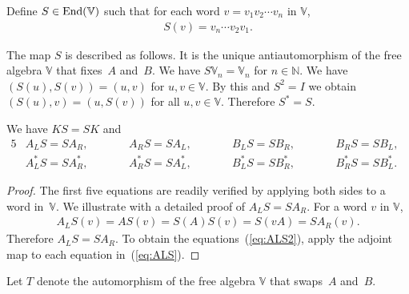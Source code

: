 \begin{Definition}\label{def:S}Define $S \in {\rm End}(\mathbb V)$ such that for each word $v = v_1 v_2 \cdots v_n$ in $\mathbb V$,
\begin{gather*}
S(v) = v_n \cdots v_2 v_1.
\end{gather*}
\end{Definition}
The map $S$ is described as follows. It is the unique antiautomorphism of the free algebra $\mathbb V$
that fixes~$A$ and~$B$. We have
$S \mathbb V_n = \mathbb V_n$ for $n \in \mathbb N$.
We have $(S(u), S(v))= (u,v) $ for $u,v \in \mathbb V$. By this and
$S^2=I$ we obtain
$(S(u),v)= (u,S(v))$ for all $u,v \in \mathbb V$. Therefore
$S^*=S$.
\begin{Lemma}\label{lem:scom} We have $KS=SK$ and
\begin{alignat}{5}
&A_L S = S A_R, \qquad &&
A_R S = S A_L, \qquad &&
B_L S = S B_R, \qquad &&
B_R S = S B_L, &\label{eq:ALS}
\\
& A^*_L S = S A^*_R, \qquad &&
A^*_R S = S A^*_L, \qquad &&
B^*_L S = S B^*_R, \qquad &&
B^*_R S = S B^*_L. &\label{eq:ALS2}
\end{alignat}
\end{Lemma}
\begin{proof}The first five equations are readily verified by applying both sides to
a word in~$\mathbb V$. We illustrate with a detailed proof of
$A_LS=SA_R$.
For a word $v$ in $\mathbb V$,
\begin{gather*}
A_L S(v) = AS(v) = S(A)S(v)= S(vA) = S A_R(v).
\end{gather*}
Therefore
$A_LS=SA_R$.
To obtain the equations~(\ref{eq:ALS2}), apply the adjoint map to each equation in~(\ref{eq:ALS}).
\end{proof}

\begin{Definition}\label{def:T}Let $T$ denote the automorphism of the free algebra $\mathbb V$ that
swaps~$A$ and~$B$.
\end{Definition}

